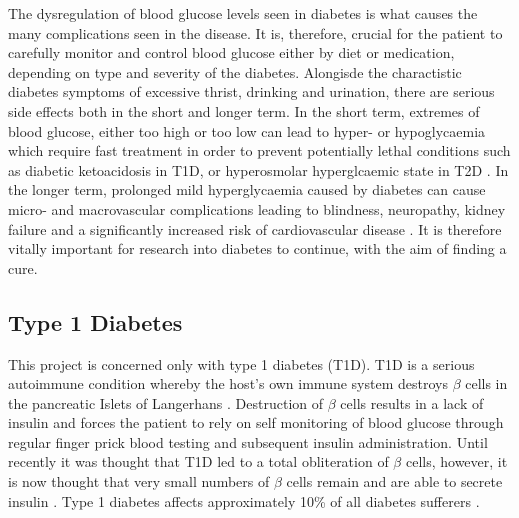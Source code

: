 The dysregulation of blood glucose levels seen in diabetes is what causes the many complications seen in the disease.
It is, therefore, crucial for the patient to carefully monitor and control blood glucose either by diet or medication, depending on type and severity of the diabetes.
Alongisde the charactistic diabetes symptoms of excessive thrist, drinking and urination, there are serious side effects both in the short and longer term.
In the short term, extremes of blood glucose, either too high or too low can lead to hyper- or hypoglycaemia which require fast treatment in order to prevent potentially lethal conditions such as diabetic ketoacidosis in T1D, or hyperosmolar hyperglcaemic state in T2D \citep{OxClinMed, DiabetesUK}.
In the longer term, prolonged mild hyperglycaemia caused by diabetes can cause micro- and macrovascular complications leading to blindness, neuropathy, kidney failure and a significantly increased risk of cardiovascular disease \citep{OxClinMed}.
It is therefore vitally important for research into diabetes to continue, with the aim of finding a cure.

\subsection{Type 1 Diabetes}

This project is concerned only with type 1 diabetes (T1D).
T1D is a serious autoimmune condition whereby the host's own immune system destroys $\beta$ cells in the pancreatic Islets of Langerhans \citep{Daneman2006}.
Destruction of $\beta$ cells results in a lack of insulin and forces the patient to rely on self monitoring of blood glucose through regular finger prick blood testing and subsequent insulin administration.
Until recently it was thought that T1D led to a total obliteration of $\beta$ cells, however, it is now thought that very small numbers of $\beta$ cells remain and are able to secrete insulin \citep{Oram2014, Veld2014}.
Type 1 diabetes affects approximately 10\% of all diabetes sufferers \citep{DiabetesUK}.






